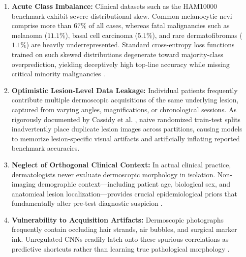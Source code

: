 \documentclass[journal,10pt,twocolumn]{IEEEtran}
\begin{document}
\begin{enumerate}
    \item \textbf{Acute Class Imbalance:} Clinical datasets such as the HAM10000 benchmark \cite{tschandl2018ham10000} exhibit severe distributional skew. Common melanocytic nevi comprise more than $67\%$ of all cases, whereas fatal malignancies such as melanoma ($11.1\%$), basal cell carcinoma ($5.1\%$), and rare dermatofibromas ($1.1\%$) are heavily underrepresented. Standard cross-entropy loss functions trained on such skewed distributions degenerate toward majority-class overprediction, yielding deceptively high top-line accuracy while missing critical minority malignancies \cite{lin2017focal, cui2019class}.
    \item \textbf{Optimistic Lesion-Level Data Leakage:} Individual patients frequently contribute multiple dermoscopic acquisitions of the same underlying lesion, captured from varying angles, magnifications, or chronological sessions. As rigorously documented by Cassidy et al. \cite{cassidy2022analysis}, naive randomized train-test splits inadvertently place duplicate lesion images across partitions, causing models to memorize lesion-specific visual artifacts and artificially inflating reported benchmark accuracies.
    \item \textbf{Neglect of Orthogonal Clinical Context:} In actual clinical practice, dermatologists never evaluate dermoscopic morphology in isolation. Non-imaging demographic context—including patient age, biological sex, and anatomical lesion localization—provides crucial epidemiological priors that fundamentally alter pre-test diagnostic suspicion \cite{pacheco2020impact, rotemberg2021patient, yap2018multimodal}.
    \item \textbf{Vulnerability to Acquisition Artifacts:} Dermoscopic photographs frequently contain occluding hair strands, air bubbles, and surgical marker ink. Unregulated CNNs readily latch onto these spurious correlations as predictive shortcuts rather than learning true pathological morphology \cite{bissoto2019deconstructing, bissoto2020debiasing, winkler2019association}.
\end{enumerate}
\end{document}
